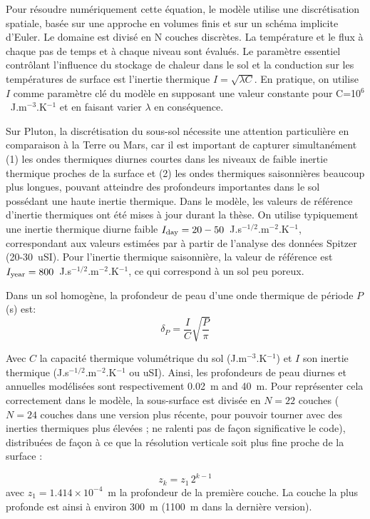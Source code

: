 Pour résoudre numériquement cette équation, le modèle utilise une discrétisation spatiale, basée sur une approche en volumes finis et sur un schéma implicite d’Euler. Le  domaine est divisé en N couches discrètes. La température et le flux à chaque pas de temps et à chaque niveau sont évalués. 
Le paramètre essentiel contrôlant l’influence du stockage de chaleur dans le sol et la conduction sur les températures de surface est l’inertie thermique $I = \sqrt{\lambda C} $. En pratique, on utilise $I$ comme paramètre clé du modèle en supposant une valeur constante pour C=10$^6$~J.m$^{-3}$.K$^{-1}$ et en faisant varier $\lambda$ en conséquence.

Sur Pluton, la discrétisation du sous-sol nécessite une attention particulière en comparaison à la Terre ou Mars, car il est important de capturer simultanément (1) les ondes thermiques diurnes courtes dans les niveaux de faible inertie thermique proches de la surface et (2) les ondes thermiques saisonnières beaucoup plus longues, pouvant atteindre des profondeurs importantes dans le sol possédant une haute inertie thermique.   
Dans le modèle, les valeurs de référence d’inertie thermiques ont été mises à jour durant la thèse. On utilise typiquement une inertie thermique diurne faible $I_{\mbox{\scriptsize day}}=20-50$~J.s$^{-1/2}$.m$^{-2}$.K$^{-1}$, correspondant aux valeurs estimées par \citet{Lell:11b} à partir de l’analyse des données Spitzer (20-30~uSI). Pour l’inertie thermique saisonnière, la valeur de référence est $I_{\mbox{\scriptsize year}}=800$~J.s$^{-1/2}$.m$^{-2}$.K$^{-1}$, ce qui correspond à un sol peu poreux. 

Dans un sol homogène, la profondeur de peau d’une onde thermique de période $P$ (s) est:
\begin{equation}
\delta_{P} =  \frac{I}{C} \sqrt{\frac{P}{\pi}}
\end{equation}

Avec $C$ la capacité thermique volumétrique du sol (J.m$^{-3}$.K$^{-1}$) et $I$ son inertie thermique (J.s$^{-1/2}$.m$^{-2}$.K$^{-1}$ ou uSI). 
Ainsi, les profondeurs de peau diurnes et annuelles modélisées sont respectivement 0.02~m and 40~m. Pour représenter cela correctement dans le modèle, la sous-surface est divisée en $N=22$ couches ($N=24$ couches dans une version plus récente, pour pouvoir tourner avec des inerties thermiques plus élevées ; ne ralenti pas de façon significative le code), distribuées de façon à ce que la résolution verticale soit plus fine proche de la surface :

\begin{equation}
z_k = z_1 \, 2^{k-1}
\end{equation}
avec $z_1 = 1.414 \times 10^{-4}$~m la profondeur de la première couche.  La couche la plus profonde est ainsi à environ 300~m (1100~m dans la dernière version).

